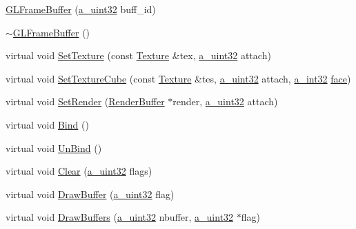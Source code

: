 \begin{DoxyCompactItemize}
\item 
\hyperlink{class_agmd_1_1_g_l_frame_buffer_af0f16a6a9a619b25e7b2de19250d165b}{G\+L\+Frame\+Buffer} (\hyperlink{_common_defines_8h_a964296f9770051b9e4807b1f180dd416}{a\+\_\+uint32} buff\+\_\+id)
\item 
\hyperlink{class_agmd_1_1_g_l_frame_buffer_ac45c928b86662052ec5818bb5a825e4c}{$\sim$\+G\+L\+Frame\+Buffer} ()
\item 
virtual void \hyperlink{class_agmd_1_1_g_l_frame_buffer_af91869c72a294277dd3491e60115753a}{Set\+Texture} (const \hyperlink{class_agmd_1_1_texture}{Texture} \&tex, \hyperlink{_common_defines_8h_a964296f9770051b9e4807b1f180dd416}{a\+\_\+uint32} attach)
\item 
virtual void \hyperlink{class_agmd_1_1_g_l_frame_buffer_a7fb198c28e6e3d18243e4dd5db35de00}{Set\+Texture\+Cube} (const \hyperlink{class_agmd_1_1_texture}{Texture} \&tes, \hyperlink{_common_defines_8h_a964296f9770051b9e4807b1f180dd416}{a\+\_\+uint32} attach, \hyperlink{_common_defines_8h_ae2e4316e0b924774484a728669bebc9b}{a\+\_\+int32} \hyperlink{_planet_8cpp_ae1161f79bdbe47164b23549af2139d25}{face})
\item 
virtual void \hyperlink{class_agmd_1_1_g_l_frame_buffer_aedcf363dad623c9d1fb457f5da6b8d78}{Set\+Render} (\hyperlink{class_agmd_1_1_render_buffer}{Render\+Buffer} $\ast$render, \hyperlink{_common_defines_8h_a964296f9770051b9e4807b1f180dd416}{a\+\_\+uint32} attach)
\item 
virtual void \hyperlink{class_agmd_1_1_g_l_frame_buffer_ae5d7e0a20ab564d8dbaf5a0f3304cd00}{Bind} ()
\item 
virtual void \hyperlink{class_agmd_1_1_g_l_frame_buffer_a5f2c641f2eee6774075b27ebaaca5116}{Un\+Bind} ()
\item 
virtual void \hyperlink{class_agmd_1_1_g_l_frame_buffer_a246cdc0e9c57809198cc47f6f2b98c6a}{Clear} (\hyperlink{_common_defines_8h_a964296f9770051b9e4807b1f180dd416}{a\+\_\+uint32} flags)
\item 
virtual void \hyperlink{class_agmd_1_1_g_l_frame_buffer_a4ab81541e7f5ce00a8133f7205f2a8fa}{Draw\+Buffer} (\hyperlink{_common_defines_8h_a964296f9770051b9e4807b1f180dd416}{a\+\_\+uint32} flag)
\item 
virtual void \hyperlink{class_agmd_1_1_g_l_frame_buffer_adfb6868ae71343a897ce1886a234c4d9}{Draw\+Buffers} (\hyperlink{_common_defines_8h_a964296f9770051b9e4807b1f180dd416}{a\+\_\+uint32} nbuffer, \hyperlink{_common_defines_8h_a964296f9770051b9e4807b1f180dd416}{a\+\_\+uint32} $\ast$flag)

\end{DoxyCompactItemize}
